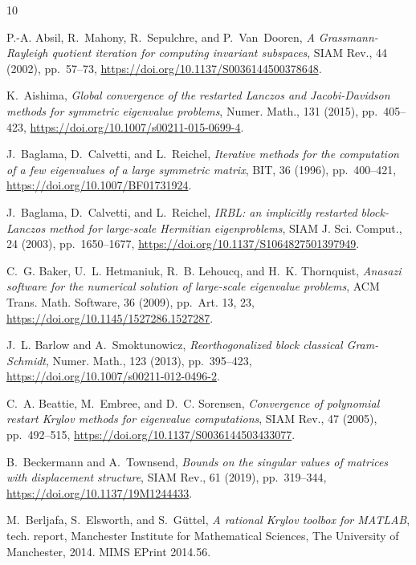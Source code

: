 \documentclass{siamart190516}
\begin{document}

\begin{thebibliography}{10}

{\sc P.-A. Absil, R.~Mahony, R.~Sepulchre, and P.~Van~Dooren}, {\em A {G}rassmann-{R}ayleigh quotient iteration for computing invariant subspaces}, SIAM Rev., 44 (2002), pp.~57--73, \url{https://doi.org/10.1137/S0036144500378648}.

{\sc K.~Aishima}, {\em Global convergence of the restarted {L}anczos and {J}acobi-{D}avidson methods for symmetric eigenvalue problems}, Numer. Math., 131 (2015), pp.~405--423, \url{https://doi.org/10.1007/s00211-015-0699-4}.

{\sc J.~Baglama, D.~Calvetti, and L.~Reichel}, {\em Iterative methods for the computation of a few eigenvalues of a large symmetric matrix}, BIT, 36 (1996), pp.~400--421, \url{https://doi.org/10.1007/BF01731924}.

{\sc J.~Baglama, D.~Calvetti, and L.~Reichel}, {\em I{RBL}: an implicitly restarted block-{L}anczos method for large-scale {H}ermitian eigenproblems}, SIAM J. Sci. Comput., 24 (2003), pp.~1650--1677, \url{https://doi.org/10.1137/S1064827501397949}.

{\sc C.~G. Baker, U.~L. Hetmaniuk, R.~B. Lehoucq, and H.~K. Thornquist}, {\em Anasazi software for the numerical solution of large-scale eigenvalue problems}, ACM Trans. Math. Software, 36 (2009), pp.~Art. 13, 23, \url{https://doi.org/10.1145/1527286.1527287}.

{\sc J.~L. Barlow and A.~Smoktunowicz}, {\em Reorthogonalized block classical {G}ram-{S}chmidt}, Numer. Math., 123 (2013), pp.~395--423, \url{https://doi.org/10.1007/s00211-012-0496-2}.

{\sc C.~A. Beattie, M.~Embree, and D.~C. Sorensen}, {\em Convergence of polynomial restart {K}rylov methods for eigenvalue computations}, SIAM Rev., 47 (2005), pp.~492--515, \url{https://doi.org/10.1137/S0036144503433077}.

{\sc B.~Beckermann and A.~Townsend}, {\em Bounds on the singular values of matrices with displacement structure}, SIAM Rev., 61 (2019), pp.~319--344, \url{https://doi.org/10.1137/19M1244433}.

{\sc M.~Berljafa, S.~Elsworth, and S.~G{\"u}ttel}, {\em A rational {K}rylov toolbox for {MATLAB}}, tech. report, Manchester Institute for Mathematical Sciences, The University of Manchester, 2014.
\newblock MIMS EPrint 2014.56.


\end{thebibliography}
\end{document}
